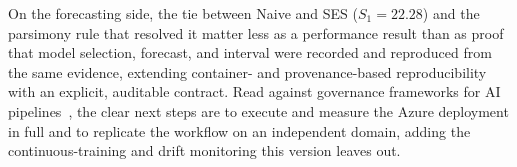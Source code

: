 \documentclass[runningheads]{llncs}
\begin{document}
        On the forecasting side, the tie between Naive and SES ($S_1=22.28$) and the parsimony rule that resolved it matter less as a performance result than as proof that model selection, forecast, and interval were recorded and reproduced from the same evidence, extending container- and provenance-based reproducibility~\cite{ref7,ref8} with an explicit, auditable contract. Read against governance frameworks for AI pipelines~\cite{ref20}, the clear next steps are to execute and measure the Azure deployment in full and to replicate the workflow on an independent domain, adding the continuous-training and drift monitoring this version leaves out.


    
    
\end{document}
